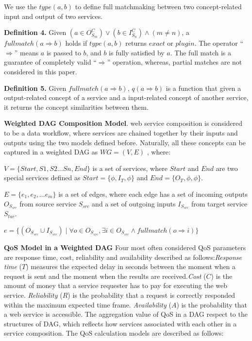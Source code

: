 \documentclass{llncs}
\begin{document}
We use the $type(a, b)$ to define full matchmaking between two concept-related input and output of two services.

\textbf{Definition 4.} Given $(a \in O^{C}_{S_m}) \vee (b \in I^{C}_{S_n}) \wedge (m \neq n) $, a $full match(a \Rightarrow b)$ holds if $type(a, b)$ returns $exact$ or $plugin$. The operator ``$ \Rightarrow$'' means $a$ is passed to $b$, and $b$ is fully satisfied by $a$. The full match is a guarantee of completely valid  ``$ \Rightarrow$'' operation, whereas, partial matches are not considered in this paper.

\textbf{Definition 5.} Given $full match(a \Rightarrow b)$, $q(a \Rightarrow b)$ is a function that given a output-related concept of a service and a input-related concept of another service, it returns the concept similarities between them.
\vspace{0.3cm}

\textbf{Weighted DAG Composition Model}. web service composition is considered to be a data workflow, where services are chained together by their inputs and outputs using the two models defined before. Naturally, all these concepts can be captured in a weighted DAG as $WG = (V, E)$ , where:

$V=\{Start, S1, S2...Sn, End\}$ is a set of services, where $Start$ and $End$ are two special services defined as $Start = \{ \phi, I_T, \phi \}$ and $End  = \{ O_T, \phi, \phi \}$. 

$E = \{e_{1}, e_{2},... e_{m} \}$ is a set of edges, where each edge has a set of incoming outputs $O_{S_{src}}$ from source service $S_{src}$ and a set of outgoing inputs $I_{S_{src}}$ from target service $S_{tar}$. 

$e = \{ (O_{S_{src}} \cup I_{S_{src}}) \mid \forall o \in O_{S_{src}}, \exists i \in O_{S_{src}} \wedge fullmatch (o \Rightarrow i) \}$
\vspace{0.5cm}

\textbf{QoS Model in a Weighted DAG}
Four most often considered QoS parameters \cite{zeng2003quality} are response time, cost, reliability and availability described as follows:\textit{Response time} ($T$) measures the expected delay in seconds between the moment when a request is sent and the moment when the results are received.\textit{Cost} ($C$) is the amount of money that a service requester has to pay for executing the web service. \textit{Reliability} ($R$) is the probability that a request is correctly responded within the maximum expected time frame. \textit{Availability} ($A$) is the probability that a web service is accessible. The aggregation value of QoS in a DAG respect to the structures of DAG, which reflects how services associated with each other in a service composition. The QoS calculation models are described as follows:
\end{document}

